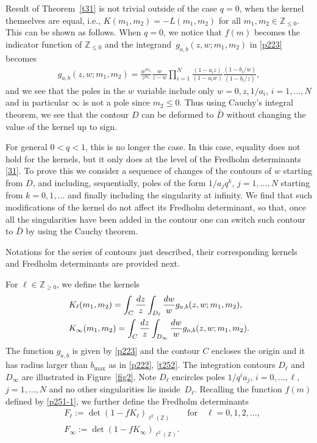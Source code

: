 \documentclass[11pt]{article}
\numberwithin{equation}{section}
\numberwithin{equation}{section}
\def\i{\infty}
\def\Z{\mathbb{Z}}
\begin{document}
Result of Theorem~\ref{t31} is not trivial outside of the case $q=0$, when the kernel themselves are equal, i.e., $K(m_1,m_2)=-L(m_1,m_2)$ for all $m_1,m_2\in\Z_{\le 0}$. This can be shown as follows. When $q=0$, we notice that $f(m)$ becomes the indicator function of $\mathbb{Z}_{\le 0}$ and the integrand~${g_{a,b}(z,w;m_1,m_2)}$ in \eqref{p223} becomes
\begin{align*}
 g_{a,b}(z,w;m_1,m_2)
 =\frac{w^{m_2}}{z^{m_1}}
\frac{w}{z-w}
\prod_{i=1}^N
\frac{(1-a_i z)}{(1-a_iw)}
\frac{(1-b_i/w)}{(1-b_i/z)},
\end{align*}
and we see that the poles in the $w$ variable include only $w=0, z, 1/a_i$, $i=1,\dots,N$ and in particular $\infty$ is not a pole since $m_2 \le 0$. Thus using Cauchy's integral theorem, we see that the contour $D$ can be deformed to $\bar{D}$ without changing the value of the kernel up to sign.

For general $0<q<1$, this is no longer the case. In this case, equality does not hold for the kernels, but it only does at the level of the Fredholm determinants \eqref{31}. To prove this we consider a sequence of changes of the contours of $w$ starting from $D$, and including, sequentially, poles of the form $1/a_j q^k$, $j=1,\dots,N$ starting from $k=0,1,\dots$ and finally including the singularity at infinity. We find that such modifications of the kernel do not affect its Fredholm determinant, so that, once all the singularities have been added in the contour one can switch such contour to $\bar{D}$ by using the Cauchy theorem.


Notations for the series of contours just described, their corresponding kernels and Fredholm determinants are provided next.
\begin{Definition}\label{d31}
For $\ell\in\mathbb{Z}_{\ge 0}$, we define the kernels
\begin{align}
\label{d31-3}
&K_\ell (m_1,m_2)=
\int_C\frac{{\rm d}z}{z}\int_{D_\ell}\frac{{\rm d}w}{w} g_{a,b}(z,w;m_1,m_2),
\\
\label{d31-4}
&K_{\i}(m_1,m_2)
=
\int_C\frac{{\rm d}z}{z}\int_{D_{\i}}\frac{{\rm d}w}{w} g_{a,b}(z,w;m_1,m_2).
\end{align}
The function $g_{a,b}$ is given by \eqref{p223} and the contour $C$ encloses the origin and it has radius larger than $b_{\max}$ as in \eqref{p222}, \eqref{t252}. The integration contours $D_\ell$ and $D_{\infty}$ are illustrated in Figure~\ref{fig2}.
Note $D_\ell$ encircles poles $1/q^{i}a_j$, $i=0,\dots,\ell$, $j=1,\dots,N$ and no other singularities lie inside~$D_{\ell}$.
Recalling the function $f(m)$ defined by \eqref{p251-1}, we further define the Fredholm determinants
\begin{align}
\label{d31-1}
&F_\ell:=\det(1-fK_\ell)_{\ell^2(\Z)}\qquad \text{for}\quad \ell=0,1,2,\dots,
\\
\label{d31-2}
&F_{\infty}:=\det(1-f K_{\i})_{\ell^2(\Z)}.
\end{align}
\end{Definition}
\end{document}

